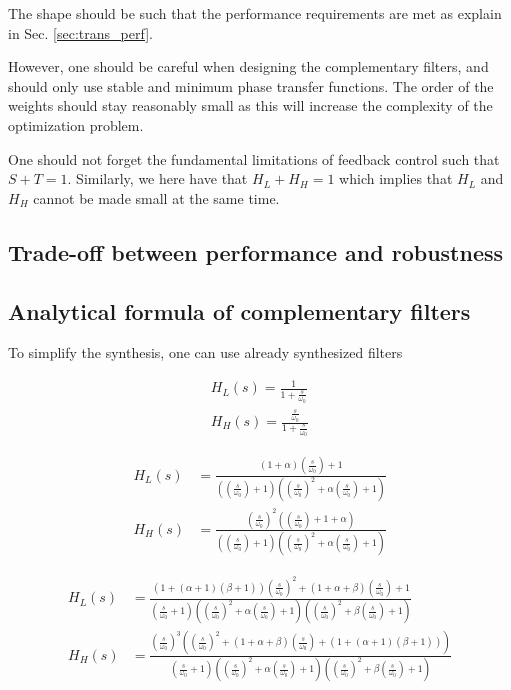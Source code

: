 \documentclass[9pt, technote, a4paper]{ieeeconf}
\begin{document}
The shape should be such that the performance requirements are met as explain in Sec. \ref{sec:trans_perf}.

However, one should be careful when designing the complementary filters, and should only use stable and minimum phase transfer functions.
The order of the weights should stay reasonably small as this will increase the complexity of the optimization problem.

One should not forget the fundamental limitations of feedback control such that \(S + T = 1\).
Similarly, we here have that \(H_L + H_H = 1\) which implies that \(H_L\) and \(H_H\) cannot be made small at the same time.

\subsection{Trade-off between performance and robustness}
\label{sec:org7af3efe}

\subsection{Analytical formula of complementary filters}
\label{sec:org477b4a4}
  \label{sec:analytical_complementary_filters}
To simplify the synthesis, one can use already synthesized filters

\begin{align}
  H_L(s) = \frac{1}{1 + \frac{s}{\omega_0}}\\
  H_H(s) = \frac{\frac{s}{\omega_0}}{1 + \frac{s}{\omega_0}}
\end{align}

\begin{align}
  H_L(s) &= \frac{(1+\alpha) (\frac{s}{\omega_0})+1}{\left((\frac{s}{\omega_0})+1\right) \left((\frac{s}{\omega_0})^2 + \alpha (\frac{s}{\omega_0}) + 1\right)}\\
  H_H(s) &= \frac{(\frac{s}{\omega_0})^2 \left((\frac{s}{\omega_0})+1+\alpha\right)}{\left((\frac{s}{\omega_0})+1\right) \left((\frac{s}{\omega_0})^2 + \alpha (\frac{s}{\omega_0}) + 1\right)}
\end{align}

\begin{align}
  H_L(s) &= \frac{\left(1+(\alpha+1)(\beta+1)\right) (\frac{s}{\omega_0})^2 + (1+\alpha+\beta)(\frac{s}{\omega_0}) + 1}{\left(\frac{s}{\omega_0} + 1\right) \left( (\frac{s}{\omega_0})^2 + \alpha (\frac{s}{\omega_0}) + 1 \right) \left( (\frac{s}{\omega_0})^2 + \beta (\frac{s}{\omega_0}) + 1 \right)}\\
  H_H(s) &= \frac{(\frac{s}{\omega_0})^3 \left( (\frac{s}{\omega_0})^2 + (1+\alpha+\beta) (\frac{s}{\omega_0}) + (1+(\alpha+1)(\beta+1)) \right)}{\left(\frac{s}{\omega_0} + 1\right) \left( (\frac{s}{\omega_0})^2 + \alpha (\frac{s}{\omega_0}) + 1 \right) \left( (\frac{s}{\omega_0})^2 + \beta (\frac{s}{\omega_0}) + 1 \right)}
\end{align}
\end{document}
